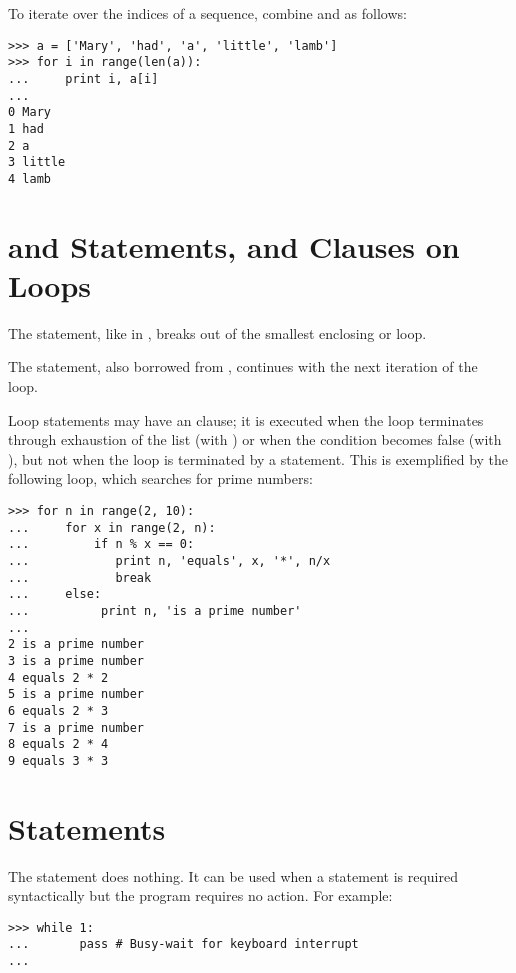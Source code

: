 \documentclass{manual}
\begin{document}
To iterate over the indices of a sequence, combine 
and  as follows:

\begin{verbatim}
>>> a = ['Mary', 'had', 'a', 'little', 'lamb']
>>> for i in range(len(a)):
...     print i, a[i]
... 
0 Mary
1 had
2 a
3 little
4 lamb
\end{verbatim}

\section{ and  Statements, and
          Clauses on Loops}
\label{break}

The  statement, like in \C{}, breaks out of the smallest
enclosing  or  loop.

The  statement, also borrowed from \C{}, continues
with the next iteration of the loop.

Loop statements may have an  clause; it is executed when
the loop terminates through exhaustion of the list (with
) or when the condition becomes false (with
), but not when the loop is terminated by a
 statement.  This is exemplified by the following loop,
which searches for prime numbers:

\begin{verbatim}
>>> for n in range(2, 10):
...     for x in range(2, n):
...         if n % x == 0:
...            print n, 'equals', x, '*', n/x
...            break
...     else:
...          print n, 'is a prime number'
... 
2 is a prime number
3 is a prime number
4 equals 2 * 2
5 is a prime number
6 equals 2 * 3
7 is a prime number
8 equals 2 * 4
9 equals 3 * 3
\end{verbatim}

\section{ Statements}
\label{pass}

The  statement does nothing.
It can be used when a statement is required syntactically but the
program requires no action.
For example:

\begin{verbatim}
>>> while 1:
...       pass # Busy-wait for keyboard interrupt
... 
\end{verbatim}
\end{document}
